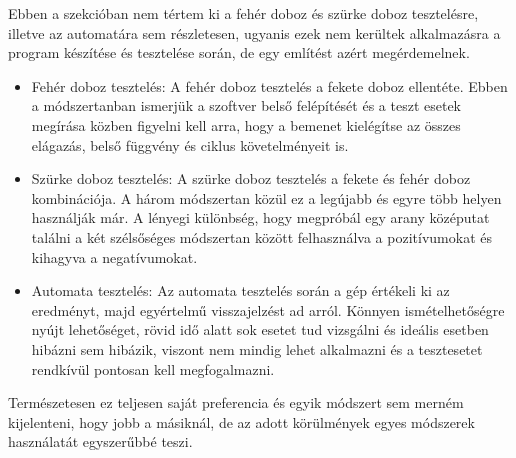 
Ebben a szekcióban nem tértem ki a fehér doboz és szürke doboz tesztelésre, illetve az automatára sem részletesen, ugyanis ezek nem kerültek alkalmazásra a program készítése és tesztelése során, de egy említést azért megérdemelnek.

\begin{itemize}
\item Fehér doboz tesztelés: A fehér doboz tesztelés a fekete doboz ellentéte. Ebben a módszertanban ismerjük a szoftver belső felépítését és a teszt esetek megírása közben figyelni kell arra, hogy a bemenet kielégítse az összes elágazás, belső függvény és ciklus követelményeit is.
\label{tab:teszt}

\item Szürke doboz tesztelés: A szürke doboz tesztelés a fekete és fehér doboz kombinációja. A három módszertan közül ez a legújabb és egyre több helyen használják már. A lényegi különbség, hogy megpróbál egy arany középutat találni a két szélsőséges módszertan között felhasználva a pozitívumokat és kihagyva a negatívumokat.

\item Automata tesztelés: Az automata tesztelés során a gép értékeli ki az eredményt, majd egyértelmű visszajelzést ad arról. Könnyen ismételhetőségre nyújt lehetőséget, rövid idő alatt sok esetet tud vizsgálni és ideális esetben hibázni sem hibázik, viszont nem mindig lehet alkalmazni és a tesztesetet rendkívül pontosan kell megfogalmazni.
\end{itemize}
Természetesen ez teljesen saját preferencia és egyik módszert sem merném kijelenteni, hogy jobb a másiknál, de az adott körülmények egyes módszerek használatát egyszerűbbé teszi.